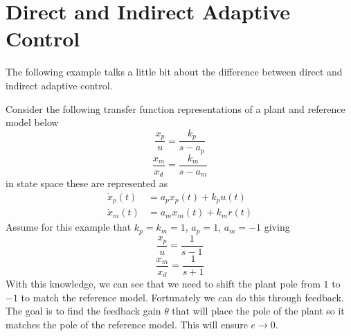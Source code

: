 \section{Direct and Indirect Adaptive Control}

The following example talks a little bit about the difference between direct and indirect adaptive control.

\begin{example}
  Consider the following transfer function representations of a plant and reference model below
  \begin{equation*}
    \frac{x_{p}}{u}=\frac{k_{p}}{s-a_{p}}
  \end{equation*}
  \begin{equation*}
    \frac{x_{m}}{x_{d}}=\frac{k_{m}}{s-a_{m}}
  \end{equation*}
  in state space these are represented as
  \begin{align*}
    \dot{x}_{p}(t)&=a_{p}x_{p}(t)+k_{p}u(t) \\
    \dot{x}_{m}(t)&=a_{m}x_{m}(t)+k_{m}r(t)
  \end{align*}
  Assume for this example that $k_{p}=k_{m}=1$, $a_{p}=1$, $a_{m}=-1$ giving
  \begin{equation*}
    \frac{x_{p}}{u}=\frac{1}{s-1}
  \end{equation*}
  \begin{equation*}
    \frac{x_{m}}{x_{d}}=\frac{1}{s+1}
  \end{equation*}
  With this knowledge, we can see that we need to shift the plant pole from $1$ to $-1$ to match the reference model.
  Fortunately we can do this through feedback.
  The goal is to find the feedback gain $\theta$ that will place the pole of the plant so it matches the pole of the reference model.
  This will ensure $e\rightarrow0$.
  \begin{center}
\end{center}
\end{example}
